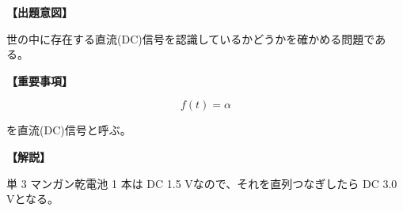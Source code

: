 \noindent \textbf{【出題意図】}

\noindent 世の中に存在する直流(DC)信号を認識しているかどうかを確かめる問題である。

\vspace{1em}
\noindent \textbf{【重要事項】}

\[
f(t) = \alpha
\]

\medskip
\noindent を直流(DC)信号と呼ぶ。


\vspace{1em}
\noindent \textbf{【解説】}

\noindent 単 3 マンガン乾電池 1 本は DC 1.5 Vなので、それを直列つなぎしたら DC 3.0 Vとなる。
